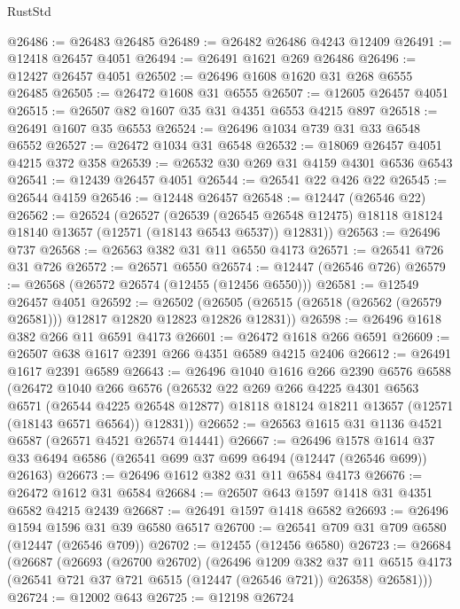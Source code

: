 \begin{lexlean}{RustStd}
\begin{coremodule}
@26486 := @26483 @26485
@26489 := @26482 @26486 @4243 @12409
@26491 := @12418 @26457 @4051
@26494 := @26491 @1621 @269 @26486
@26496 := @12427 @26457 @4051
@26502 := @26496 @1608 @1620 @31 @268 @6555 @26485
@26505 := @26472 @1608 @31 @6555
@26507 := @12605 @26457 @4051
@26515 := @26507 @82 @1607 @35 @31 @4351 @6553 @4215 @897
@26518 := @26491 @1607 @35 @6553
@26524 := @26496 @1034 @739 @31 @33 @6548 @6552
@26527 := @26472 @1034 @31 @6548
@26532 := @18069 @26457 @4051 @4215 @372 @358
@26539 := @26532 @30 @269 @31 @4159 @4301 @6536 @6543
@26541 := @12439 @26457 @4051
@26544 := @26541 @22 @426 @22
@26545 := @26544 @4159
@26546 := @12448 @26457
@26548 := @12447 (@26546 @22)
@26562 := @26524
    (@26527
      (@26539
        (@26545 @26548 @12475)
        @18118
        @18124
        @18140
        @13657
        (@12571 (@18143 @6543 @6537))
        @12831))
@26563 := @26496 @737
@26568 := @26563 @382 @31 @11 @6550 @4173
@26571 := @26541 @726 @31 @726
@26572 := @26571 @6550
@26574 := @12447 (@26546 @726)
@26579 := @26568 (@26572 @26574 (@12455 (@12456 @6550)))
@26581 := @12549 @26457 @4051
@26592 := @26502
    (@26505 (@26515 (@26518 (@26562 (@26579 @26581))) @12817 @12820 @12823 @12826 @12831))
@26598 := @26496 @1618 @382 @266 @11 @6591 @4173
@26601 := @26472 @1618 @266 @6591
@26609 := @26507 @638 @1617 @2391 @266 @4351 @6589 @4215 @2406
@26612 := @26491 @1617 @2391 @6589
@26643 := @26496
    @1040
    @1616
    @266
    @2390
    @6576
    @6588
    (@26472
      @1040
      @266
      @6576
      (@26532
        @22
        @269
        @266
        @4225
        @4301
        @6563
        @6571
        (@26544 @4225 @26548 @12877)
        @18118
        @18124
        @18211
        @13657
        (@12571 (@18143 @6571 @6564))
        @12831))
@26652 := @26563 @1615 @31 @1136 @4521 @6587 (@26571 @4521 @26574 @14441)
@26667 := @26496
    @1578
    @1614
    @37
    @33
    @6494
    @6586
    (@26541 @699 @37 @699 @6494 (@12447 (@26546 @699)) @26163)
@26673 := @26496 @1612 @382 @31 @11 @6584 @4173
@26676 := @26472 @1612 @31 @6584
@26684 := @26507 @643 @1597 @1418 @31 @4351 @6582 @4215 @2439
@26687 := @26491 @1597 @1418 @6582
@26693 := @26496 @1594 @1596 @31 @39 @6580 @6517
@26700 := @26541 @709 @31 @709 @6580 (@12447 (@26546 @709))
@26702 := @12455 (@12456 @6580)
@26723 := @26684
    (@26687
      (@26693
        (@26700 @26702)
        (@26496
          @1209
          @382
          @37
          @11
          @6515
          @4173
          (@26541 @721 @37 @721 @6515 (@12447 (@26546 @721)) @26358)
          @26581)))
@26724 := @12002 @643
@26725 := @12198 @26724

\end{coremodule}
\end{lexlean}
